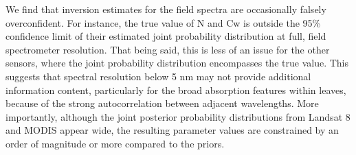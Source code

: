We find that inversion estimates for the field spectra are occasionally falsely overconfident.
For instance, the true value of N and Cw is outside the 95\% confidence limit of their estimated joint probability distribution at full, field spectrometer resolution.
That being said, this is less of an issue for the other sensors, where the joint probability distribution encompasses the true value.
This suggests that spectral resolution below 5 nm may not provide additional information content, particularly for the broad absorption features within leaves, because of the strong autocorrelation between adjacent wavelengths.
More importantly, although the joint posterior probability distributions from Landsat 8 and MODIS appear wide, the resulting parameter values are constrained by an order of magnitude or more compared to the priors.
